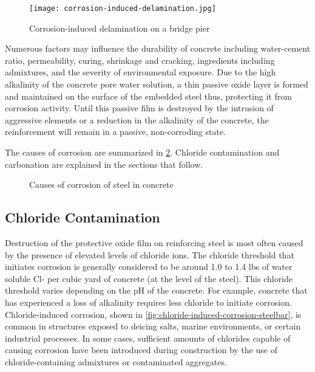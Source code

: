 \begin{figure}
  \texttt{[image: corrosion-induced-delamination.jpg]}
  \caption{Corrosion-induced delamination on a bridge pier}
  \label{fig:corrosion-induced-delamination}
\end{figure}

Numerous factors may influence the durability of concrete including water-cement ratio, permeability, curing, shrinkage and cracking, ingredients including admixtures, and the severity of environmental exposure. Due to the high alkalinity of the concrete pore water solution, a thin passive oxide layer is formed and maintained on the surface of the embedded steel thus, protecting it from corrosion activity. Until this passive film is destroyed by the intrusion of aggressive elements or a reduction in the alkalinity of the concrete, the reinforcement will remain in a passive, non-corroding state.

The causes of corrosion are summarized in \cref{fig:causes-of-corrosion-steelbar}. Chloride contamination and carbonation are explained in the sections that follow.

\begin{figure}
  \caption{Causes of corrosion of steel in concrete}
  \label{fig:causes-of-corrosion-steelbar}
\end{figure}


\subsection{Chloride Contamination}
Destruction of the protective oxide film on reinforcing steel is most often caused by the presence of elevated levels of chloride ions. The chloride threshold that initiates corrosion is generally considered to be around 1.0 to 1.4 lbs of water soluble Cl- per cubic yard of concrete (at the level of the steel). This chloride threshold varies depending on the pH of the concrete. For example, concrete that has experienced a loss of alkalinity requires less chloride to initiate corrosion. Chloride-induced corrosion, shown in \cref{fig:chloride-induced-corrosion-steelbar}, is common in structures exposed to deicing salts, marine environments, or certain industrial processes. In some cases, sufficient amounts of chlorides capable of causing corrosion have been introduced during construction by the use of chloride-containing admixtures or
contaminated aggregates.

